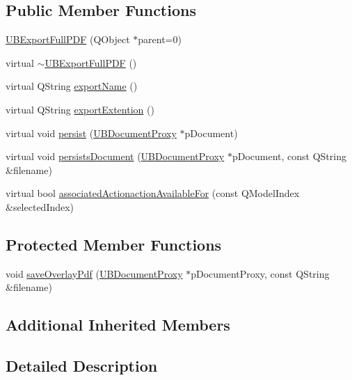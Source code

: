 \subsection*{Public Member Functions}
\begin{DoxyCompactItemize}
\item 
\hyperlink{class_u_b_export_full_p_d_f_adec84f9e2fa06503fe6359bd9f6df04d}{U\-B\-Export\-Full\-P\-D\-F} (Q\-Object $\ast$parent=0)
\item 
virtual \hyperlink{class_u_b_export_full_p_d_f_abcf7cb7abd8b7f8f680cf72cd32f5bc5}{$\sim$\-U\-B\-Export\-Full\-P\-D\-F} ()
\item 
virtual Q\-String \hyperlink{class_u_b_export_full_p_d_f_a250b765fd6333b4d80580562562ed8b7}{export\-Name} ()
\item 
virtual Q\-String \hyperlink{class_u_b_export_full_p_d_f_af1ad55af22c95727340acfd1ed1a8819}{export\-Extention} ()
\item 
virtual void \hyperlink{class_u_b_export_full_p_d_f_a8c0bd950f21f469ce17daa1add9a75bf}{persist} (\hyperlink{class_u_b_document_proxy}{U\-B\-Document\-Proxy} $\ast$p\-Document)
\item 
virtual void \hyperlink{class_u_b_export_full_p_d_f_a2101b6fdc6ed273a6e2c062d5ce7e12c}{persists\-Document} (\hyperlink{class_u_b_document_proxy}{U\-B\-Document\-Proxy} $\ast$p\-Document, const Q\-String \&filename)
\item 
virtual bool \hyperlink{class_u_b_export_full_p_d_f_afa76e3b13993bd3c7a2fd10751596189}{associated\-Actionaction\-Available\-For} (const Q\-Model\-Index \&selected\-Index)
\end{DoxyCompactItemize}
\subsection*{Protected Member Functions}
\begin{DoxyCompactItemize}
\item 
void \hyperlink{class_u_b_export_full_p_d_f_a7f1a5b95025ce905379961d179716fdd}{save\-Overlay\-Pdf} (\hyperlink{class_u_b_document_proxy}{U\-B\-Document\-Proxy} $\ast$p\-Document\-Proxy, const Q\-String \&filename)
\end{DoxyCompactItemize}
\subsection*{Additional Inherited Members}


\subsection{Detailed Description}


